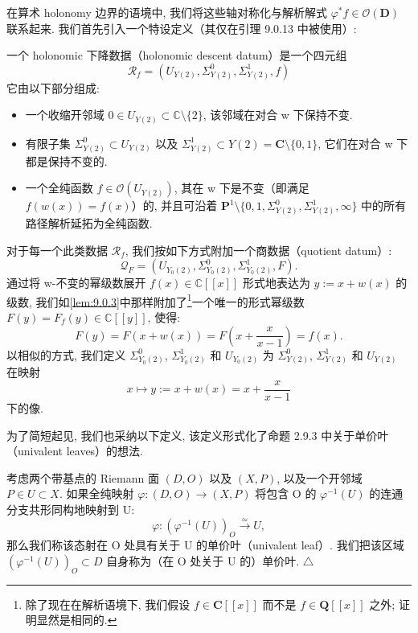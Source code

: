 在算术 holonomy 边界的语境中, 我们将这些轴对称化与解析解式 \(\varphi^* f \in \mathcal{O}(\mathbf{D})\) 联系起来. 
我们首先引入一个特设定义（其仅在引理 9.0.13 中被使用）:

\begin{definition}\label{def:9.0.10}
一个 holonomic 下降数据（holonomic descent datum）是一个四元组
\[ \mathcal{R}_f = \left(U_{Y(2)}, \Sigma_{Y(2)}^0, \Sigma_{Y(2)}^1, f\right) \]
它由以下部分组成:
\begin{itemize}
  \item[(1)] 一个收缩开邻域 \(0 \in U_{Y(2)} \subset \mathbb{C} \setminus \{2\}\), 该邻域在对合 w 下保持不变.
  \item[(2)] 有限子集 \(\Sigma_{Y(2)}^0 \subset U_{Y(2)}\) 以及 \(\Sigma_{Y(2)}^1 \subset Y(2) = \mathbf{C} \setminus \{0, 1\}\), 它们在对合 w 下都是保持不变的.
  \item[(3)] 一个全纯函数 \(f \in \mathcal{O}(U_{Y(2)})\), 其在 w 下是不变（即满足 \(f(w(x)) = f(x)\)）的, 并且可沿着 \(\mathbf{P}^1 \setminus \{0, 1, \Sigma^0_{Y(2)}, \Sigma^1_{Y(2)}, \infty\}\) 中的所有路径解析延拓为全纯函数.
\end{itemize}
对于每一个此类数据 \(\mathcal{R}_f\), 我们按如下方式附加一个商数据（quotient datum）:
\[ \mathcal{Q}_F = \left(U_{Y_0(2)}, \Sigma_{Y_0(2)}^0, \Sigma_{Y_0(2)}^1, F\right). \]
通过将 w-不变的幂级数展开 \(f(x) \in \mathbb{C}[\![x]\!]\) 形式地表达为 \(y := x + w(x)\) 的级数, 
我们如\autoref{lem:9.0.3}中那样附加了\footnote{除了现在在解析语境下, 我们假设 \(f \in \mathbf{C}[\![x]\!]\) 而不是 \(f \in \mathbf{Q}[\![x]\!]\) 之外; 证明显然是相同的.}一个唯一的形式幂级数 \(F(y) = F_f(y) \in \mathbb{C}[\![y]\!]\), 使得:
\begin{equation}\label{eq:9.0.11}
F(y) = F(x + w(x)) = F\left(x + \frac{x}{x - 1}\right) = f(x).
\end{equation}
以相似的方式, 我们定义 \(\Sigma_{Y_0(2)}^0\), \(\Sigma_{Y_0(2)}^1\) 和 \(U_{Y_0(2)}\) 为 \(\Sigma_{Y(2)}^0\), \(\Sigma_{Y(2)}^1\) 和 \(U_{Y(2)}\) 
在映射
\[ x \mapsto y := x + w(x) = x + \frac{x}{x - 1} \]
下的像.
\end{definition}

为了简短起见, 我们也采纳以下定义, 该定义形式化了命题 2.9.3 中关于单价叶（univalent leaves）的想法.

\begin{definition}\label{def:9.0.12}
考虑两个带基点的 Riemann 面 \((D, O)\) 以及 \((X, P)\), 以及一个开邻域 \(P \in U \subset X\). 
如果全纯映射 \(\varphi : (D, O) \to (X, P)\) 将包含 O 的 \(\varphi^{-1}(U)\) 
的连通分支共形同构地映射到 U:
\[ \varphi: (\varphi^{-1}(U))_{O} \xrightarrow{\simeq} U, \]
那么我们称该态射在 O 处具有关于 U 的单价叶（univalent leaf）. 
我们把该区域 \((\varphi^{-1}(U))_O \subset D\) 自身称为（在 O 处关于 U 的）单价叶. \(\triangle\)
\end{definition}

